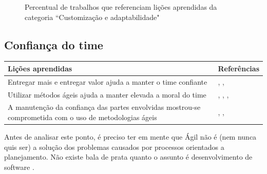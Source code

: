 \begin{figure}[H]
	\centering
	\captionsetup{justification=centering}
	\caption{Percentual de trabalhos que referenciam lições aprendidas da categoria ``Customização e adaptabilidade"}
	\label{fig:adaptabilidade}
\end{figure}

\subsection{Confiança do time}

\begin{table}[H]
	\centering
	\begin{tabularx}{\linewidth}{ | X | p{5cm} | } \hline \textbf{Lições aprendidas} & \textbf{Referências} \\ \hline
		Entregar mais e entregar valor  ajuda a manter o time confiante & \cite{Block2011}, \cite{Asnawi2012}, \cite{Parzinello2012} \\ \hline
		Utilizar métodos ágeis ajuda a manter elevada a moral do time & \cite{Asnawi2012}, \cite{Claudia2013}, \cite{Nokia2013}, \cite{Ahmed2008} \\ \hline
		A manutenção da confiança das partes envolvidas mostrou-se comprometida com o uso de metodologias ágeis & \cite{Nokia2013}, \cite{Piegas2012}, \cite{Bastos2013} \\ \hline
	\end{tabularx}
\end{table}

Antes de analisar este ponto, é preciso ter em mente que Ágil não é (nem nunca quis ser) a solução dos problemas causados por processos orientados a planejamento. Não existe bala de prata quanto o assunto é desenvolvimento de software \cite{Piegas2012,Microsoft2013}.

